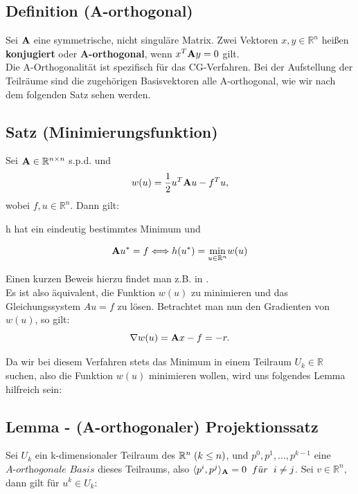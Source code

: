 \subsection{Definition (A-orthogonal)}\label{ss.A-orthogonal}
Sei ${\textbf{A}}$ eine symmetrische, nicht singuläre Matrix. Zwei Vektoren $x,y \in \mathbb{R}^{n}$ heißen \textbf{konjugiert} oder \textbf{A-orthogonal}, wenn $x^{T}{\textbf{A}}y = 0$ gilt.\\

Die A-Orthogonalität ist spezifisch für das CG-Verfahren. Bei der Aufstellung der Teilräume sind die zugehörigen Basisvektoren alle A-orthogonal, wie wir nach dem folgenden Satz sehen werden.

\subsection{Satz (Minimierungsfunktion)}
Sei ${\textbf{A}}\in\mathbb{R}^{n \times n}$ s.p.d. und
\begin{equation}
w(u) = \frac {1} {2} u^{T}{\textbf{A}}u - f^{T}u,
\end{equation}
wobei $f,u \in \mathbb{R}^{n}$. Dann gilt:
\begin{center}
h hat ein eindeutig bestimmtes Minimum und
\end{center}
\begin{equation}
{\textbf{A}}u^{*} = f \Longleftrightarrow h(u^{*}) = \underset{u\in\mathbb{R}^{n}}{\min} w(u)
\end{equation}

Einen kurzen Beweis hierzu findet man z.B. in \cite{DR6}.\\
Es ist also äquivalent, die Funktion $w(u)$ zu minimieren und das Gleichungssystem $Au = f$ zu lösen. Betrachtet man nun den Gradienten von $w(u)$, so gilt:
\begin{equation}
\nabla w(u) = {\textbf{A}}x - f = -r.
\end{equation}

Da wir bei diesem Verfahren stets das Minimum in einem Teilraum $U_{k} \in \mathbb{R}$ suchen, also die Funktion $w(u)$ minimieren wollen, wird uns folgendes Lemma hilfreich sein:

\subsection{Lemma - (A-orthogonaler) Projektionssatz}\label{s.Projektionssatz}

Sei $U_{k}$ ein k-dimensionaler Teilraum des $\mathbb{R}^{n} \hspace{1mm} (k \le n)$, und $p^{0}, p^{1},...,p^{k-1}$ eine $\textit{A-orthogonale Basis}$ dieses Teilraums, also $\langle p^{i}, p^{j} \rangle _{{\textbf{A}}} = 0 \hspace{2mm} f\ddot{u}r \hspace{2mm} i \ne j$. Sei $v \in \mathbb{R}^{n}$, dann gilt für $u^{k} \in U_{k}$:

